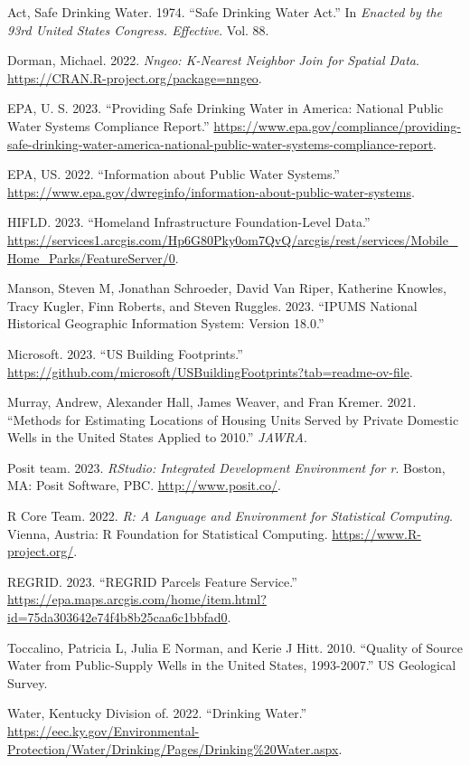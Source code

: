\documentclass[12pt]{article}
\newlength{\cslhangindent}
\newenvironment{CSLReferences}[2] %
 {\begin{list}{}{%
  \setlength{\itemindent}{0pt}
  \setlength{\leftmargin}{0pt}
  \setlength{\parsep}{0pt}
  \ifodd #1
   \setlength{\leftmargin}{\cslhangindent}
   \setlength{\itemindent}{-1\cslhangindent}
  \fi
  \setlength{\itemsep}{#2\baselineskip}}}
 {\end{list}}
\begin{document}
\label{refs}
\begin{CSLReferences}{1}{0}
Act, Safe Drinking Water. 1974. {``Safe Drinking Water Act.''} In
\emph{Enacted by the 93rd United States Congress. Effective}. Vol. 88.

Dorman, Michael. 2022. \emph{Nngeo: K-Nearest Neighbor Join for Spatial
Data}. \url{https://CRAN.R-project.org/package=nngeo}.

EPA, U. S. 2023. {``Providing Safe Drinking Water in America: National
Public Water Systems Compliance Report.''}
\url{https://www.epa.gov/compliance/providing-safe-drinking-water-america-national-public-water-systems-compliance-report}.

EPA, US. 2022. {``Information about Public Water Systems.''}
\url{https://www.epa.gov/dwreginfo/information-about-public-water-systems}.

HIFLD. 2023. {``Homeland Infrastructure Foundation-Level Data.''}
\url{https://services1.arcgis.com/Hp6G80Pky0om7QvQ/arcgis/rest/services/Mobile_Home_Parks/FeatureServer/0}.

Manson, Steven M, Jonathan Schroeder, David Van Riper, Katherine
Knowles, Tracy Kugler, Finn Roberts, and Steven Ruggles. 2023. {``IPUMS
National Historical Geographic Information System: Version 18.0.''}

Microsoft. 2023. {``US Building Footprints.''}
\url{https://github.com/microsoft/USBuildingFootprints?tab=readme-ov-file}.

Murray, Andrew, Alexander Hall, James Weaver, and Fran Kremer. 2021.
{``Methods for Estimating Locations of Housing Units Served by Private
Domestic Wells in the United States Applied to 2010.''} \emph{JAWRA}.

Posit team. 2023. \emph{RStudio: Integrated Development Environment for
r}. Boston, MA: Posit Software, PBC. \url{http://www.posit.co/}.

R Core Team. 2022. \emph{R: A Language and Environment for Statistical
Computing}. Vienna, Austria: R Foundation for Statistical Computing.
\url{https://www.R-project.org/}.

REGRID. 2023. {``REGRID Parcels Feature Service.''}
\url{https://epa.maps.arcgis.com/home/item.html?id=75da303642e74f4b8b25caa6c1bbfad0}.

Toccalino, Patricia L, Julia E Norman, and Kerie J Hitt. 2010.
{``Quality of Source Water from Public-Supply Wells in the United
States, 1993-2007.''} US Geological Survey.

Water, Kentucky Division of. 2022. {``Drinking Water.''}
\url{https://eec.ky.gov/Environmental-Protection/Water/Drinking/Pages/Drinking\%20Water.aspx}.

\end{CSLReferences}
\end{document}
